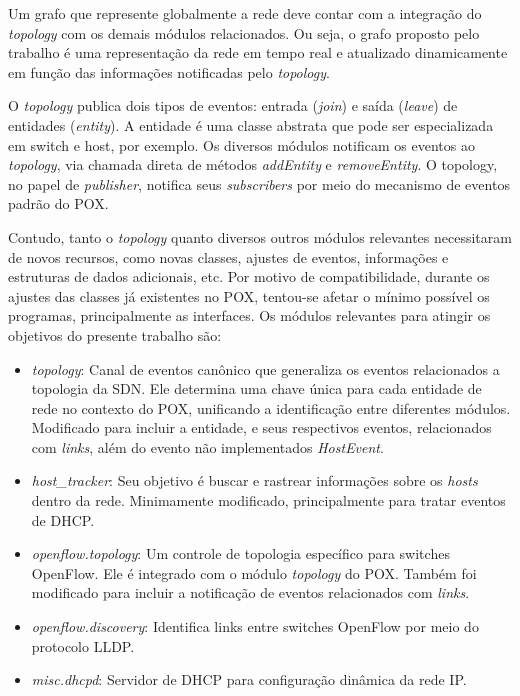 Um grafo que represente globalmente a rede 
deve contar com a integração do \emph{topology} com os
demais módulos relacionados. 
Ou seja, o grafo proposto pelo trabalho 
é uma representação da rede em tempo 
real e atualizado dinamicamente em função das informações notificadas 
pelo \emph{topology}. 

O \emph{topology} publica dois tipos de eventos:
entrada ({\it join}) e saída ({\it leave}) 
de entidades ({\it entity}).
A entidade é uma classe abstrata que pode ser
especializada em switch e host, por exemplo.
Os diversos módulos notificam os eventos ao \emph{topology},
via chamada direta de métodos \emph{addEntity} e \emph{removeEntity}. 
O topology, no papel de  {\it publisher}, notifica seus {\it subscribers}
por meio do mecanismo de eventos padrão do POX.

Contudo, tanto o \emph{topology} quanto diversos outros módulos relevantes
necessitaram de novos recursos, como novas classes, 
ajustes de eventos, informações e estruturas de dados adicionais, etc.
Por motivo de compatibilidade, durante os ajustes das classes já existentes no POX,
tentou-se afetar o mínimo possível os programas, principalmente as interfaces.
Os módulos relevantes para atingir os objetivos do presente trabalho são:

\begin{itemize}

\item{\emph{topology}}: 
Canal de eventos canônico que generaliza os eventos relacionados a topologia da SDN.
Ele determina uma chave única para cada entidade de rede no contexto do POX,
unificando a identificação entre diferentes módulos.
Modificado para incluir a entidade, e seus respectivos eventos, 
relacionados com \emph{links},
além do evento não implementados \emph{HostEvent}.

\item{\emph{host\_tracker}}: 
Seu objetivo é buscar e rastrear informações sobre os {\it hosts} dentro da rede.
Minimamente modificado, principalmente para tratar eventos de DHCP.

\item{\emph{openflow.topology}}: 
Um controle de topologia específico para switches OpenFlow.
Ele é integrado com o módulo \emph{topology} do POX.
Também foi modificado para incluir a notificação de eventos relacionados com \emph{links}.

\item{\emph{openflow.discovery}}: 
Identifica links entre switches OpenFlow por meio do protocolo LLDP.

\item{\emph{misc.dhcpd}}:
Servidor de DHCP para configuração dinâmica da rede IP.

\end{itemize}

